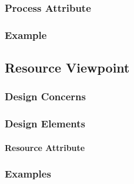 \documentclass[letterpaper,10pt,titlepage,draftclsnofoot,onecolumn,onesided] {IEEEtran}
\begin{document}
\subsubsection{Process Attribute}
\subsubsection{Example}

\subsection{Resource Viewpoint}
\subsubsection{Design Concerns}
\subsubsection{Design Elements}
\paragraph{Resource Attribute}
\subsubsection{Examples}




%
%
\end{document}
